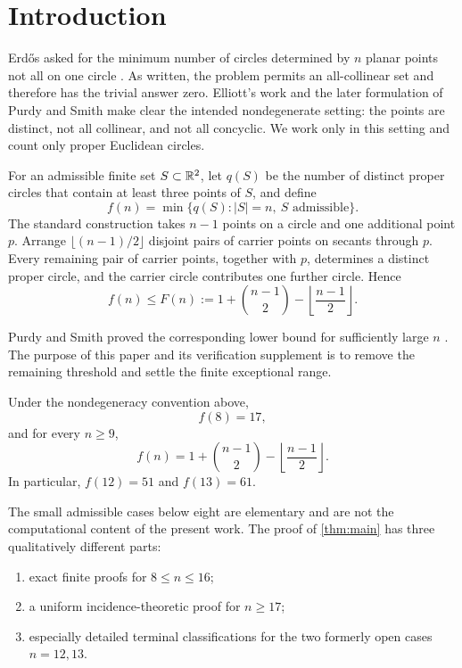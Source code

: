 \section{Introduction}

Erd\H{o}s asked for the minimum number of circles determined by $n$ planar points not all on one circle \cite{erdos1961}.  As written, the problem permits an all-collinear set and therefore has the trivial answer zero.  Elliott's work \cite{elliott1967} and the later formulation of Purdy and Smith \cite{purdysmith2010} make clear the intended nondegenerate setting: the points are distinct, not all collinear, and not all concyclic.  We work only in this setting and count only proper Euclidean circles.

For an admissible finite set $S\subset\mathbb R^2$, let $q(S)$ be the number of distinct proper circles that contain at least three points of $S$, and define
\[
 f(n)=\min\{q(S): |S|=n,\ S\text{ admissible}\}.
\]
The standard construction takes $n-1$ points on a circle and one additional point $p$.  Arrange
$\lfloor(n-1)/2\rfloor$ disjoint pairs of carrier points on secants through $p$.  Every remaining pair of carrier points, together with $p$, determines a distinct proper circle, and the carrier circle contributes one further circle.  Hence
\begin{equation}\label{eq:construction}
 f(n)\le F(n):=1+\binom{n-1}{2}-\left\lfloor\frac{n-1}{2}\right\rfloor.
\end{equation}

Purdy and Smith proved the corresponding lower bound for sufficiently large $n$ \cite{purdysmith2010}.  The purpose of this paper and its verification supplement is to remove the remaining threshold and settle the finite exceptional range.

\begin{theorem}\label{thm:main}
Under the nondegeneracy convention above,
\[
 f(8)=17,
\]
and for every $n\ge9$,
\[
 f(n)=1+\binom{n-1}{2}-\left\lfloor\frac{n-1}{2}\right\rfloor.
\]
In particular, $f(12)=51$ and $f(13)=61$.
\end{theorem}

The small admissible cases below eight are elementary and are not the computational content of the present work.  The proof of \cref{thm:main} has three qualitatively different parts:
\begin{enumerate}
\item exact finite proofs for $8\le n\le16$;
\item a uniform incidence-theoretic proof for $n\ge17$;
\item especially detailed terminal classifications for the two formerly open cases $n=12,13$.
\end{enumerate}

